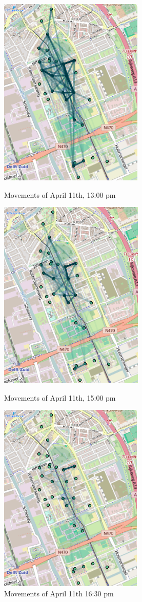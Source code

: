 \begin{figure}[H]
\includegraphics[scale=0.6,left]{frame045}
\captionsetup{justification=centering}
\caption{Movements of April 11th, 13:00 pm}
\endminipage\hfill
{}
\includegraphics[scale=0.6,center]{frame057}
\captionsetup{justification=centering}
\caption{Movements of April 11th, 15:00 pm}
\endminipage\hfill
{}
\includegraphics[scale=0.6,right]{frame066}
\captionsetup{justification=centering}
\caption{Movements of April 11th 16:30 pm}
\endminipage\hfill
\end{figure}

